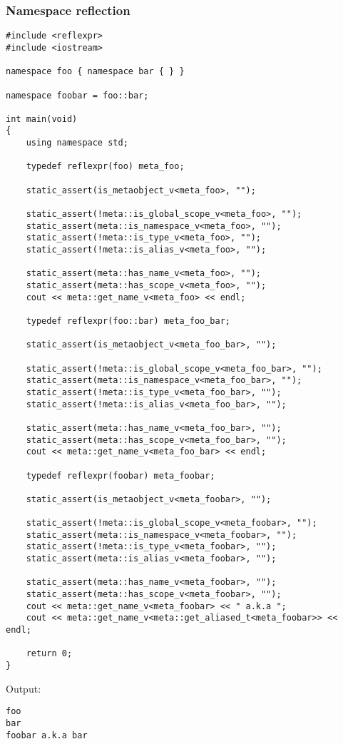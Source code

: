 \subsubsection{Namespace reflection}

\begin{verbatim}
#include <reflexpr>
#include <iostream>

namespace foo { namespace bar { } }

namespace foobar = foo::bar;

int main(void)
{
	using namespace std;

	typedef reflexpr(foo) meta_foo;

	static_assert(is_metaobject_v<meta_foo>, "");

	static_assert(!meta::is_global_scope_v<meta_foo>, "");
	static_assert(meta::is_namespace_v<meta_foo>, "");
	static_assert(!meta::is_type_v<meta_foo>, "");
	static_assert(!meta::is_alias_v<meta_foo>, "");

	static_assert(meta::has_name_v<meta_foo>, "");
	static_assert(meta::has_scope_v<meta_foo>, "");
	cout << meta::get_name_v<meta_foo> << endl;

	typedef reflexpr(foo::bar) meta_foo_bar;

	static_assert(is_metaobject_v<meta_foo_bar>, "");

	static_assert(!meta::is_global_scope_v<meta_foo_bar>, "");
	static_assert(meta::is_namespace_v<meta_foo_bar>, "");
	static_assert(!meta::is_type_v<meta_foo_bar>, "");
	static_assert(!meta::is_alias_v<meta_foo_bar>, "");

	static_assert(meta::has_name_v<meta_foo_bar>, "");
	static_assert(meta::has_scope_v<meta_foo_bar>, "");
	cout << meta::get_name_v<meta_foo_bar> << endl;

	typedef reflexpr(foobar) meta_foobar;

	static_assert(is_metaobject_v<meta_foobar>, "");

	static_assert(!meta::is_global_scope_v<meta_foobar>, "");
	static_assert(meta::is_namespace_v<meta_foobar>, "");
	static_assert(!meta::is_type_v<meta_foobar>, "");
	static_assert(meta::is_alias_v<meta_foobar>, "");

	static_assert(meta::has_name_v<meta_foobar>, "");
	static_assert(meta::has_scope_v<meta_foobar>, "");
	cout << meta::get_name_v<meta_foobar> << " a.k.a ";
	cout << meta::get_name_v<meta::get_aliased_t<meta_foobar>> << endl;

	return 0;
}
\end{verbatim}

Output:

\begin{verbatim}
foo
bar
foobar a.k.a bar
\end{verbatim}

